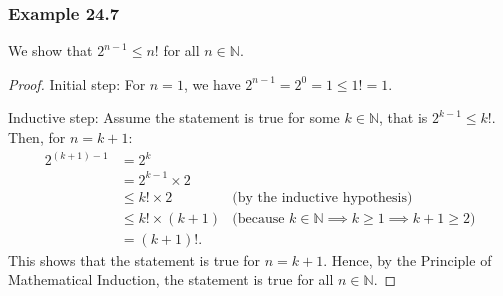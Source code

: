\documentclass{article}
\begin{document}
\subsubsection*{Example 24.7}
We show that $2^{n-1} \le n!$ for all $n\in\mathbb{N}$.
\begin{proof}
  Initial step: For $n=1$, we have $2^{n-1}=2^0=1 \le 1!=1$.

  Inductive step: Assume the statement is true for some $k\in\mathbb{N}$, that is $2^{k-1} \le k!$.
  Then, for $n=k+1$:
  \begin{align*}
    2^{(k+1)-1} & = 2^k \\
    & = 2^{k-1} \times 2 \\
    & \le k!\times2 & \text{(by the inductive hypothesis)} \\
    & \le k!\times(k+1) & \text{(because $k\in\mathbb{N} \implies k\ge1 \implies k+1\ge2$)} \\
    & = (k+1)!.
  \end{align*}
  This shows that the statement is true for $n=k+1$. Hence, by the Principle of Mathematical
  Induction, the statement is true for all $n\in\mathbb{N}$.
\end{proof}
\end{document}

